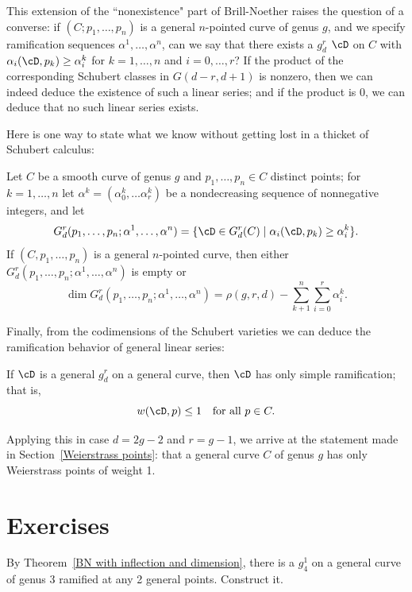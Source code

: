 This extension of the ``nonexistence" part of Brill-Noether raises the question of a converse: if $(C;p_1,\dots,p_n)$ is a general $n$-pointed curve of genus $g$, and we specify ramification sequences $\alpha^1, \dots, \alpha^n$, can we say that there exists a $g^r_d$ $\cD$ on $C$ with $\alpha_i(\cD, p_k) \geq \alpha^k_i$ for $k=1,\dots,n$ and $i = 0, \dots, r$? If the product of the corresponding Schubert classes in $G(d-r, d+1)$ is nonzero, then we can indeed deduce the existence of such a linear series; and if the product is 0, we can deduce that no such linear series exists.

Here is one way to state what we know without getting lost in a thicket of Schubert calculus:

\begin{theorem}\label{BN with inflection and dimension}
Let $C$ be a smooth curve of genus $g$ and $p_1,\dots,p_n \in C$ distinct points; for $k = 1,\dots,n$ let $\alpha^k = (\alpha^k_0,\dots\alpha^k_r)$ be a nondecreasing sequence of nonnegative integers, and let
$$
G^r_d(p_1,\dots,p_n; \alpha^1,\dots,\alpha^n) = \{\cD \in G^r_d(C) \mid \alpha_i(\cD, p_k) \geq \alpha^k_i \}.
$$
If $(C, p_1,\dots,p_n)$ is a general $n$-pointed curve, then either $G^r_d(p_1,\dots,p_n; \alpha^1,\dots,\alpha^n)$ is empty or
$$
\dim G^r_d(p_1,\dots,p_n; \alpha^1,\dots,\alpha^n) = \rho(g,r,d) - \sum_{k+1}^n \sum_{i=0}^r \alpha^k_i.
$$
\end{theorem}

Finally, from the codimensions of the Schubert varieties  we can deduce the ramification behavior of general
linear series:

\begin{theorem}
If $\cD$ is a general $g^r_d$ on a general curve, then $\cD$ has only simple ramification; that is,	
$$
w(\cD, p) \leq 1 \quad \text{for all } p \in C.
$$
\end{theorem}

Applying this in case $d=2g-2$ and $r = g-1$, we arrive at the statement made in Section~\ref{Weierstrass points}: that a general curve $C$ of genus $g$ has only Weierstrass points of weight 1.

\section{Exercises}

\begin{exercise}
  By Theorem~\ref{BN with inflection and dimension}, there is a $g^1_4$ on a general curve of genus 3 ramified at any 2 general points. Construct it.
\end{exercise}


